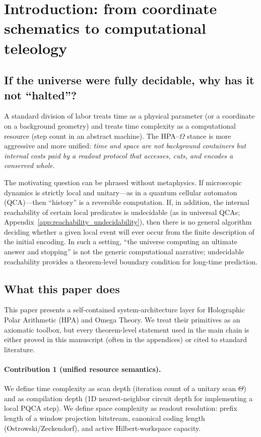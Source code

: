 \section{Introduction: from coordinate schematics to computational teleology}
\label{sec:introduction}

\subsection{If the universe were fully decidable, why has it not ``halted''?}
A standard division of labor treats time as a physical parameter (or a coordinate on a background geometry) and treats time complexity as a computational resource (step count in an abstract machine). The HPA--$\Omega$ stance is more aggressive and more unified: \emph{time and space are not background containers but internal costs paid by a readout protocol that accesses, cuts, and encodes a conserved whole}.

The motivating question can be phrased without metaphysics. If microscopic dynamics is strictly local and unitary---as in a quantum cellular automaton (QCA)---then ``history'' is a reversible computation. If, in addition, the internal reachability of certain local predicates is undecidable (as in universal QCAs; Appendix~\ref{app:reachability_undecidability}), then there is no general algorithm deciding whether a given local event will ever occur from the finite description of the initial encoding. In such a setting, ``the universe computing an ultimate answer and stopping'' is not the generic computational narrative; undecidable reachability provides a theorem-level boundary condition for long-time prediction.

\subsection{What this paper does}
This paper presents a self-contained system-architecture layer for Holographic Polar Arithmetic (HPA) and Omega Theory.
We treat their primitives as an axiomatic toolbox, but every theorem-level statement used in the main chain is either proved in this manuscript (often in the appendices) or cited to standard literature.

\paragraph{Contribution 1 (unified resource semantics).}
We define time complexity as scan depth (iteration count of a unitary scan $\Theta$) and as compilation depth (1D nearest-neighbor circuit depth for implementing a local PQCA step). We define space complexity as readout resolution: prefix length of a window projection bitstream, canonical coding length (Ostrowski/Zeckendorf), and active Hilbert-workspace capacity.

